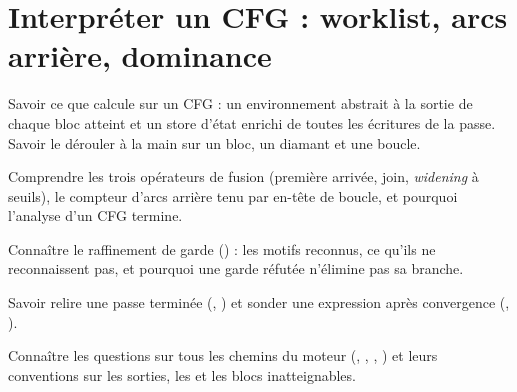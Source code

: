 \chapter{Interpréter un CFG : worklist, arcs arrière, dominance}
\label{chap:cfg-analyzer-dominance}

\begin{objectifs}
  \item Savoir ce que calcule  sur un CFG : un environnement abstrait à la sortie de chaque bloc atteint et un store d'état enrichi de toutes les écritures de la passe. Savoir le dérouler à la main sur un bloc, un diamant et une boucle.
  \item Comprendre les trois opérateurs de fusion (première arrivée, join, \emph{widening} à seuils), le compteur d'arcs arrière tenu par en-tête de boucle, et pourquoi l'analyse d'un CFG termine.
  \item Connaître le raffinement de garde () : les motifs reconnus, ce qu'ils ne reconnaissent pas, et pourquoi une garde réfutée n'élimine pas sa branche.
  \item Savoir relire une passe terminée (, ) et sonder une expression après convergence (, ).
  \item Connaître les questions \og sur tous les chemins\fg{} du moteur (, , , ) et leurs conventions sur les sorties, les  et les blocs inatteignables.
\end{objectifs}

